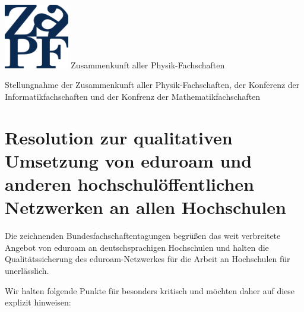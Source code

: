 \documentclass[DIV=calc]{scrartcl}
\begin{document}
\begin{adjustbox}{center}
\begin{minipage}{1.2\textwidth}
\begin{minipage}[c]{0.25\textwidth}
	\end{minipage}
	\hfill
	\begin{minipage}{4cm}
		\begin{minipage}{120pt}
			\vspace{-1.8cm}
			\includegraphics[width=80pt]{../../logo.pdf}
			\centering
			\small Zusammenkunft aller Physik-Fachschaften
		\end{minipage}
	\end{minipage}
\end{minipage}
\end{adjustbox}
\vspace{0.5cm}
\begin{center}
\huge{Stellungnahme der Zusammenkunft aller Physik-Fachschaften, der Konferenz
der Informatikfachschaften und der Konfrenz der Mathematikfachschaften} \\
\normalsize
\end{center}

\vspace{1cm}
\section*{Resolution zur qualitativen Umsetzung von  eduroam und anderen
hochschulöffentlichen Netzwerken an allen Hochschulen}

Die zeichnenden Bundesfachschaftentagungen begrüßen das weit verbreitete
Angebot von eduroam an deutschsprachigen Hochschulen und halten die
Qualitätssicherung des eduroam-Netzwerkes für die Arbeit an Hochschulen für
unerlässlich.

Wir halten folgende Punkte für besonders kritisch und möchten daher auf diese
explizit hinweisen:
\end{document}
